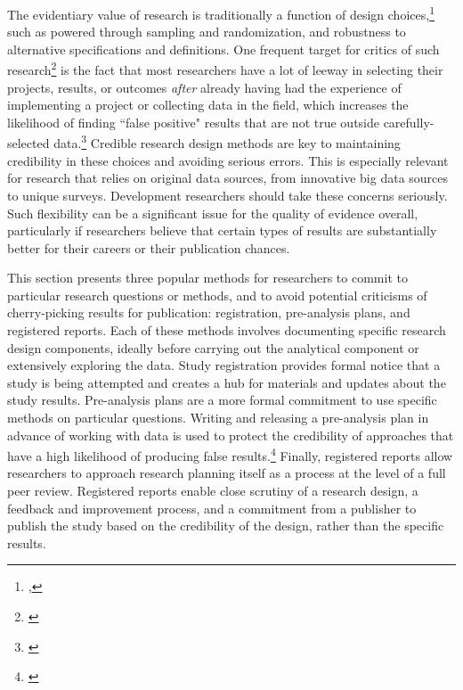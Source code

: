 \documentclass[]{tufte-book}
\begin{document}
The evidentiary value of research is traditionally a function of design
choices,\footnote{\cite{@angrist2010credibility},\cite{@ioannidis2005most}}
such as powered through sampling and randomization, and robustness to
alternative specifications and definitions. One frequent target for
critics of such research\footnote{\cite{@ioannidis2017power}} is the
fact that most researchers have a lot of leeway in selecting their
projects, results, or outcomes \emph{after} already having had the
experience of implementing a project or collecting data in the field,
which increases the likelihood of finding ``false positive" results
that are not true outside carefully-selected data.\footnote{\cite{@simmons2011false}}
Credible research design methods are key to maintaining credibility in
these choices and avoiding serious errors. This is especially relevant
for research that relies on original data sources, from innovative big
data sources to unique surveys. Development researchers should take
these concerns seriously. Such flexibility can be a significant issue
for the quality of evidence overall, particularly if researchers believe
that certain types of results are substantially better for their careers
or their publication chances.

This section presents three popular methods for researchers to commit to
particular research questions or methods, and to avoid potential
criticisms of cherry-picking results for publication: registration,
pre-analysis plans, and registered
reports.
Each of these methods involves documenting specific research design
components, ideally before carrying out the analytical component or
extensively exploring the data. Study registration provides formal
notice that a study is being attempted and creates a hub for materials
and updates about the study results. Pre-analysis plans are a more
formal commitment to use specific methods on particular questions.
Writing and releasing a pre-analysis plan in advance of working with
data is used to protect the credibility of approaches that have a high
likelihood of producing false results.\footnote{\cite{@wicherts2016degrees}}
Finally, registered reports allow researchers to approach research
planning itself as a process at the level of a full peer review.
Registered reports enable close scrutiny of a research design, a
feedback and improvement process, and a commitment from a publisher to
publish the study based on the credibility of the design, rather than
the specific results.
\end{document}
